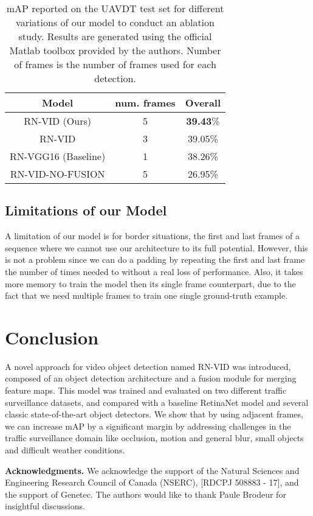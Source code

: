 \documentclass[runningheads]{llncs}
\begin{document}
\begin{table}[t]
\footnotesize
\setlength\tabcolsep{3pt} \def\arraystretch{1.5}
\centering
\caption{mAP reported on the UAVDT test set for different variations of our model to conduct an ablation study. Results are generated using the official Matlab toolbox provided by the authors. Number of frames is the number of frames used for each detection.}
\label{results-ablation}
\begin{tabular}{c|c|c}
Model & num. frames& Overall \\
\hline
\hline
RN-VID (Ours) & 5 & \textbf{39.43}\%\\
\hline
RN-VID & 3 & 39.05\%\\
\hline
RN-VGG16 (Baseline) & 1 & 38.26\%\\
\hline
RN-VID-NO-FUSION & 5 & 26.95\%\\
\end{tabular}
\vspace{-4mm}
\end{table}

\subsection{Limitations of our Model}
A limitation of our model is for border situations, the first and last frames of a sequence where we cannot use our architecture to its full potential. However, this is not a problem since we can do a padding by repeating the first and last frame the number of times needed to without a real loss of performance. Also, it takes more memory to train the model then its single frame counterpart, due to the fact that we need multiple frames to train one single ground-truth example.

\section{Conclusion}
A novel approach for video object detection named RN-VID was introduced, composed of an object detection architecture and a fusion module for merging feature maps. This model was trained and evaluated on two different traffic surveillance datasets, and compared with a baseline RetinaNet model and several classic state-of-the-art object detectors. We show that by using adjacent frames, we can increase mAP by a significant margin by addressing challenges in the traffic surveillance domain like occlusion, motion and general blur, small objects and difficult weather conditions.  

\vspace{-0.25em}

\bigskip\noindent\textbf{Acknowledgments.} We  acknowledge  the  support  of  the  Natural  Sciences and  Engineering  Research  Council  of  Canada  (NSERC), [RDCPJ 508883 - 17], and the support of Genetec. The authors would like to thank Paule Brodeur for insightful discussions.

\vspace{-1em}

{


}
\end{document}
